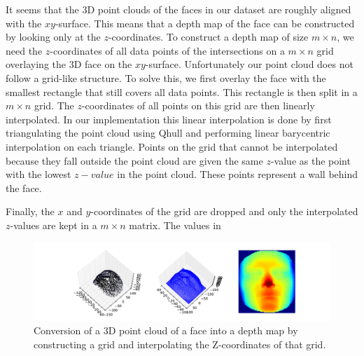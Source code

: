 \documentclass[]{article}
\begin{document}
It seems that the 3D point clouds of the faces in our dataset are roughly aligned with the $xy$-surface. This means that a depth map of the face can be constructed by looking only at the $z$-coordinates. To construct a depth map of size $m \times n$, we need the $z$-coordinates of all data points of the intersections on a $m \times n$ grid overlaying the 3D face on the $xy$-surface. Unfortunately our point cloud does not follow a grid-like structure. To solve this, we first overlay the face with the smallest rectangle that still covers all data points. This rectangle is then split in a  $m \times n$ grid. The $z$-coordinates of all points on this grid are then linearly interpolated. In our implementation this linear interpolation is done by first triangulating the point cloud using Qhull and performing linear barycentric interpolation on each triangle. \cite{numpy}
Points on the grid that cannot be interpolated because they fall outside the point cloud are given the same $z$-value as the point with the lowest $z-value$ in the point cloud. These points represent a wall behind the face.

Finally, the $x$ and $y$-coordinates of the grid are dropped and only the interpolated $z$-values are kept in a $m \times n$ matrix. The values in
\begin{figure}
	\centering
	\includegraphics[width=\textwidth]{depthmapgeneration.pdf}
	\caption{Conversion of a 3D point cloud of a face into a depth map by constructing a grid and interpolating the Z-coordinates of that grid.}
	\label{fig:depthmap-generation}
\end{figure}





\end{document}
